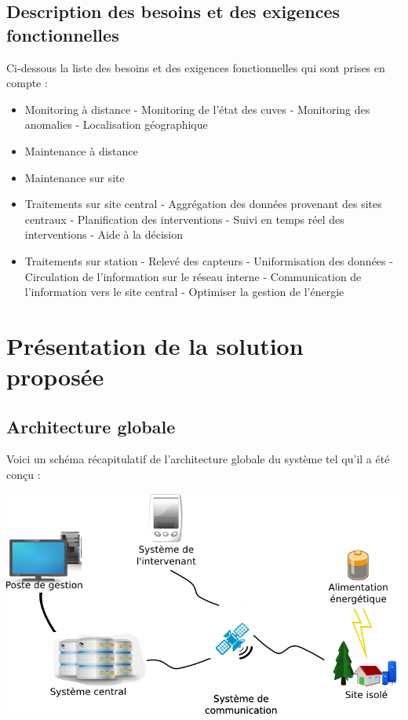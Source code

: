 \documentclass[a4paper]{article}
\begin{document}
\subsection{Description des besoins et des exigences fonctionnelles}

Ci-dessous la liste des besoins et des exigences fonctionnelles qui sont prises en compte :

\begin{itemize}
\item Monitoring à distance - Monitoring de l'état des cuves - Monitoring des anomalies - Localisation géographique
\item Maintenance à distance
\item Maintenance sur site
\item Traitements sur site central - Aggrégation des données provenant des sites centraux - Planification des interventions - Suivi en temps réel des interventions - Aide à la décision
\item Traitements sur station - Relevé des capteurs - Uniformisation des données - Circulation de l'information sur le réseau interne - Communication de l'information vers le site central - Optimiser la gestion de l'énergie
\end{itemize}

\section{Présentation de la solution proposée}

\subsection{Architecture globale}

Voici un schéma récapitulatif de l'architecture globale du système tel qu'il a été conçu :

\begin {center}
\includegraphics[width=\textwidth]{schema_architecture_generale.png}
\end {center}
\end{document}
